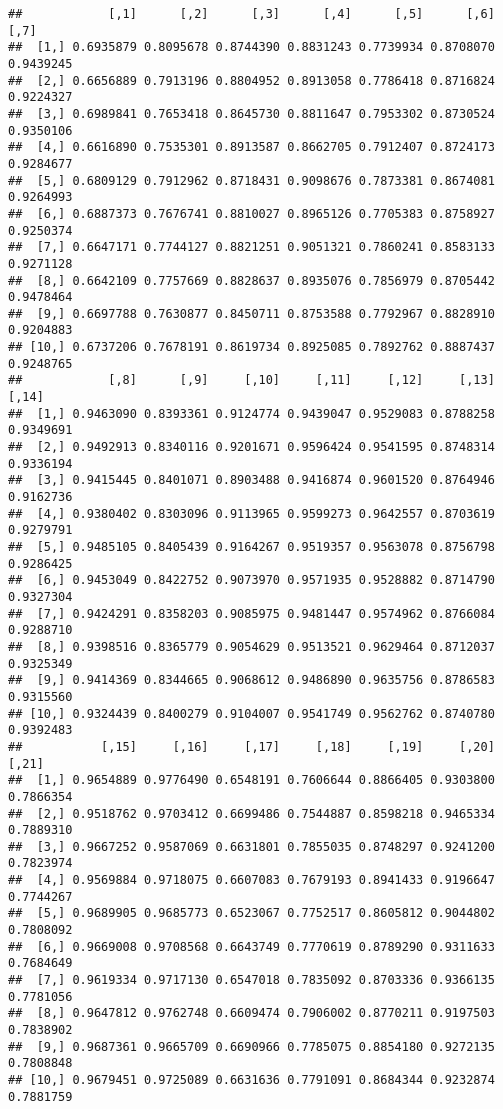\documentclass[
]{article}
\begin{document}
\begin{verbatim}
##            [,1]      [,2]      [,3]      [,4]      [,5]      [,6]      [,7]
##  [1,] 0.6935879 0.8095678 0.8744390 0.8831243 0.7739934 0.8708070 0.9439245
##  [2,] 0.6656889 0.7913196 0.8804952 0.8913058 0.7786418 0.8716824 0.9224327
##  [3,] 0.6989841 0.7653418 0.8645730 0.8811647 0.7953302 0.8730524 0.9350106
##  [4,] 0.6616890 0.7535301 0.8913587 0.8662705 0.7912407 0.8724173 0.9284677
##  [5,] 0.6809129 0.7912962 0.8718431 0.9098676 0.7873381 0.8674081 0.9264993
##  [6,] 0.6887373 0.7676741 0.8810027 0.8965126 0.7705383 0.8758927 0.9250374
##  [7,] 0.6647171 0.7744127 0.8821251 0.9051321 0.7860241 0.8583133 0.9271128
##  [8,] 0.6642109 0.7757669 0.8828637 0.8935076 0.7856979 0.8705442 0.9478464
##  [9,] 0.6697788 0.7630877 0.8450711 0.8753588 0.7792967 0.8828910 0.9204883
## [10,] 0.6737206 0.7678191 0.8619734 0.8925085 0.7892762 0.8887437 0.9248765
##            [,8]      [,9]     [,10]     [,11]     [,12]     [,13]     [,14]
##  [1,] 0.9463090 0.8393361 0.9124774 0.9439047 0.9529083 0.8788258 0.9349691
##  [2,] 0.9492913 0.8340116 0.9201671 0.9596424 0.9541595 0.8748314 0.9336194
##  [3,] 0.9415445 0.8401071 0.8903488 0.9416874 0.9601520 0.8764946 0.9162736
##  [4,] 0.9380402 0.8303096 0.9113965 0.9599273 0.9642557 0.8703619 0.9279791
##  [5,] 0.9485105 0.8405439 0.9164267 0.9519357 0.9563078 0.8756798 0.9286425
##  [6,] 0.9453049 0.8422752 0.9073970 0.9571935 0.9528882 0.8714790 0.9327304
##  [7,] 0.9424291 0.8358203 0.9085975 0.9481447 0.9574962 0.8766084 0.9288710
##  [8,] 0.9398516 0.8365779 0.9054629 0.9513521 0.9629464 0.8712037 0.9325349
##  [9,] 0.9414369 0.8344665 0.9068612 0.9486890 0.9635756 0.8786583 0.9315560
## [10,] 0.9324439 0.8400279 0.9104007 0.9541749 0.9562762 0.8740780 0.9392483
##           [,15]     [,16]     [,17]     [,18]     [,19]     [,20]     [,21]
##  [1,] 0.9654889 0.9776490 0.6548191 0.7606644 0.8866405 0.9303800 0.7866354
##  [2,] 0.9518762 0.9703412 0.6699486 0.7544887 0.8598218 0.9465334 0.7889310
##  [3,] 0.9667252 0.9587069 0.6631801 0.7855035 0.8748297 0.9241200 0.7823974
##  [4,] 0.9569884 0.9718075 0.6607083 0.7679193 0.8941433 0.9196647 0.7744267
##  [5,] 0.9689905 0.9685773 0.6523067 0.7752517 0.8605812 0.9044802 0.7808092
##  [6,] 0.9669008 0.9708568 0.6643749 0.7770619 0.8789290 0.9311633 0.7684649
##  [7,] 0.9619334 0.9717130 0.6547018 0.7835092 0.8703336 0.9366135 0.7781056
##  [8,] 0.9647812 0.9762748 0.6609474 0.7906002 0.8770211 0.9197503 0.7838902
##  [9,] 0.9687361 0.9665709 0.6690966 0.7785075 0.8854180 0.9272135 0.7808848
## [10,] 0.9679451 0.9725089 0.6631636 0.7791091 0.8684344 0.9232874 0.7881759

\end{verbatim}
\end{document}
